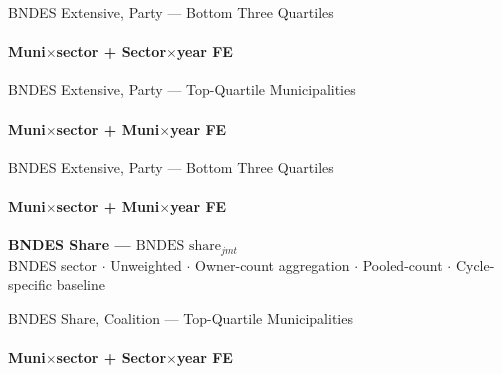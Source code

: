 \documentclass[aspectratio=169,10pt]{beamer}
\newcommand{\tbndes}{../tables/agg_firm_bndes_sector}
\begin{document}
\begin{frame}[t,shrink=5]{BNDES Extensive, Party --- Bottom Three Quartiles}
\framesubtitle{Muni$\times$sector + Sector$\times$year FE}
\begin{center}\footnotesize

\end{center}
\end{frame}

\begin{frame}[t,shrink=5]{BNDES Extensive, Party --- Top-Quartile Municipalities}
\framesubtitle{Muni$\times$sector + Muni$\times$year FE}
\begin{center}\footnotesize

\end{center}
\end{frame}

\begin{frame}[t,shrink=5]{BNDES Extensive, Party --- Bottom Three Quartiles}
\framesubtitle{Muni$\times$sector + Muni$\times$year FE}
\begin{center}\footnotesize

\end{center}
\end{frame}


\begin{frame}[plain]
\begin{center}
{\Large\textbf{BNDES Share --- $\text{BNDES share}_{jmt}$}}\\[0.5em]
\small BNDES sector $\cdot$ Unweighted $\cdot$ Owner-count aggregation $\cdot$ Pooled-count $\cdot$ Cycle-specific baseline
\end{center}
\end{frame}


\begin{frame}[t,shrink=5]{BNDES Share, Coalition --- Top-Quartile Municipalities}
\framesubtitle{Muni$\times$sector + Sector$\times$year FE}
\begin{center}\footnotesize

\end{center}
\end{frame}
\end{document}

